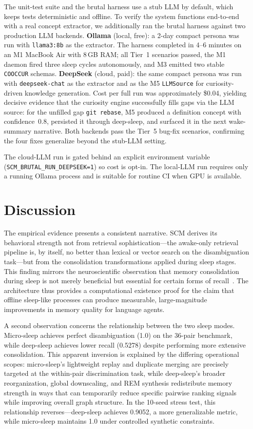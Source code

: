 \documentclass[11pt,twocolumn]{article}
\begin{document}
The unit-test suite and the brutal harness use a stub LLM by default, which keeps tests deterministic and offline. To verify the system functions end-to-end with a real concept extractor, we additionally ran the brutal harness against two production LLM backends. \textbf{Ollama} (local, free): a 2-day compact persona was run with \texttt{llama3:8b} as the extractor. The harness completed in 4--6 minutes on an M1 MacBook Air with 8\,GB RAM; all Tier~1 scenarios passed, the M1 daemon fired three sleep cycles autonomously, and M3 emitted two stable \texttt{COOCCUR} schemas. \textbf{DeepSeek} (cloud, paid): the same compact persona was run with \texttt{deepseek-chat} as the extractor and as the M5 \texttt{LLMSource} for curiosity-driven knowledge generation. Cost per full run was approximately \$0.04, yielding decisive evidence that the curiosity engine successfully fills gaps via the LLM source: for the unfilled gap \texttt{git rebase}, M5 produced a definition concept with confidence~0.8, persisted it through deep-sleep, and surfaced it in the next wake-summary narrative. Both backends pass the Tier~5 bug-fix scenarios, confirming the four fixes generalize beyond the stub-LLM setting.

The cloud-LLM run is gated behind an explicit environment variable (\texttt{SCM\_BRUTAL\_RUN\_DEEPSEEK=1}) so cost is opt-in. The local-LLM run requires only a running Ollama process and is suitable for routine CI when GPU is available.

\section{Discussion}

The empirical evidence presents a consistent narrative. SCM derives its behavioral strength not from retrieval sophistication---the awake-only retrieval pipeline is, by itself, no better than lexical or vector search on the disambiguation task---but from the consolidation transformations applied during sleep stages. This finding mirrors the neuroscientific observation that memory consolidation during sleep is not merely beneficial but essential for certain forms of recall~\cite{rasch2013sleep}. The architecture thus provides a computational existence proof for the claim that offline sleep-like processes can produce measurable, large-magnitude improvements in memory quality for language agents.

A second observation concerns the relationship between the two sleep modes. Micro-sleep achieves perfect disambiguation (1.0) on the 36-pair benchmark, while deep-sleep achieves lower recall (0.5278) despite performing more extensive consolidation. This apparent inversion is explained by the differing operational scopes: micro-sleep's lightweight replay and duplicate merging are precisely targeted at the within-pair discrimination task, while deep-sleep's broader reorganization, global downscaling, and REM synthesis redistribute memory strength in ways that can temporarily reduce specific pairwise ranking signals while improving overall graph structure. In the 10-seed stress test, this relationship reverses---deep-sleep achieves 0.9052, a more generalizable metric, while micro-sleep maintains 1.0 under controlled synthetic constraints.
\end{document}
